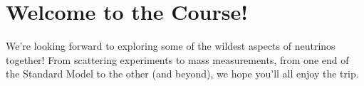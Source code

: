 \documentclass[12pt]{amsart}
\begin{document}
\section{Welcome to the Course!}

We're looking forward to exploring some of the wildest aspects of neutrinos together! From scattering experiments to mass measurements, from one end of the Standard Model to the other (and beyond), we hope you'll all enjoy the trip.
\end{document}
